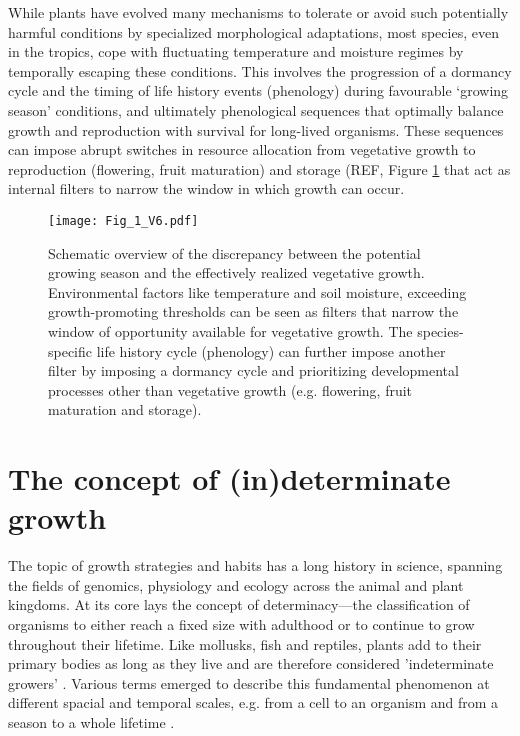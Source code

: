 \documentclass{article}
\begin{document}
		While plants have evolved many mechanisms to tolerate or avoid such potentially harmful conditions by specialized morphological adaptations, most species, even in the tropics, cope with fluctuating temperature and moisture regimes by temporally escaping these conditions. This involves the progression of a dormancy cycle and the timing of life history events (phenology) during favourable `growing season' conditions, and ultimately phenological sequences that optimally balance growth and reproduction with survival for long-lived organisms. These sequences can impose abrupt switches in resource allocation from vegetative growth to reproduction (flowering, fruit maturation) and storage (REF, Figure \ref{fig:fig_1xxx} that act as internal filters to narrow the window in which growth can occur.\\
			
		
								\begin{figure}
								\centering
								\texttt{[image: Fig\_1\_V6.pdf]} 
								\caption{Schematic overview of the discrepancy between the potential growing season and the effectively realized vegetative growth. Environmental factors like temperature and soil moisture, exceeding growth-promoting thresholds can be seen as filters that narrow the window of opportunity available for vegetative growth. The species-specific life history cycle (phenology) can further impose another filter by imposing a dormancy cycle and prioritizing developmental processes other than vegetative growth (e.g. flowering, fruit maturation and storage). }
								\label{fig:fig_1xxx}
							\end{figure}

	
\section*{The concept of (in)determinate growth}
The topic of growth strategies and habits has a long history in science, spanning the fields of genomics, physiology and ecology across the animal and plant kingdoms. At its core lays the concept of determinacy---the classification of organisms to either reach a fixed size with adulthood or to continue to grow throughout their lifetime. Like mollusks, fish and reptiles, plants add to their primary bodies as long as they live and are therefore considered 'indeterminate growers' \citep{ejsmondHowTimeGrowth2010}. Various terms emerged to describe this fundamental phenomenon at different spacial and temporal scales, e.g. from a cell to an organism and from a season to a whole lifetime \citep{mcdanielInductionDeterminationDevelopmental1992a, karkachTrajectoriesModelsIndividual2006}. \\
\end{document}
